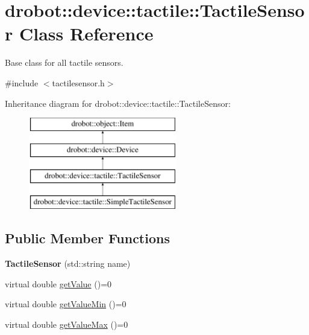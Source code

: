 \hypertarget{classdrobot_1_1device_1_1tactile_1_1TactileSensor}{\section{drobot\-:\-:device\-:\-:tactile\-:\-:Tactile\-Sensor Class Reference}
\label{classdrobot_1_1device_1_1tactile_1_1TactileSensor}
}


Base class for all tactile sensors.  




{\ttfamily \#include $<$tactilesensor.\-h$>$}

Inheritance diagram for drobot\-:\-:device\-:\-:tactile\-:\-:Tactile\-Sensor\-:\begin{figure}[H]
\begin{center}
\leavevmode
\includegraphics[height=4.000000cm]{classdrobot_1_1device_1_1tactile_1_1TactileSensor}
\end{center}
\end{figure}
\subsection*{Public Member Functions}
\begin{DoxyCompactItemize}
\item 
\hypertarget{classdrobot_1_1device_1_1tactile_1_1TactileSensor_ade88271b8e2ca587e8b45935c30bdacb}{{\bfseries Tactile\-Sensor} (std\-::string name)}\label{classdrobot_1_1device_1_1tactile_1_1TactileSensor_ade88271b8e2ca587e8b45935c30bdacb}

\item 
virtual double \hyperlink{classdrobot_1_1device_1_1tactile_1_1TactileSensor_a89fd3eb13e03638fba38fa6a4b8d17ed}{get\-Value} ()=0
\item 
virtual double \hyperlink{classdrobot_1_1device_1_1tactile_1_1TactileSensor_ae586a70280096eb764188a94c9044470}{get\-Value\-Min} ()=0
\item 
virtual double \hyperlink{classdrobot_1_1device_1_1tactile_1_1TactileSensor_a03eb99ccdc4bb78818ce556c440d372a}{get\-Value\-Max} ()=0
\end{DoxyCompactItemize}
